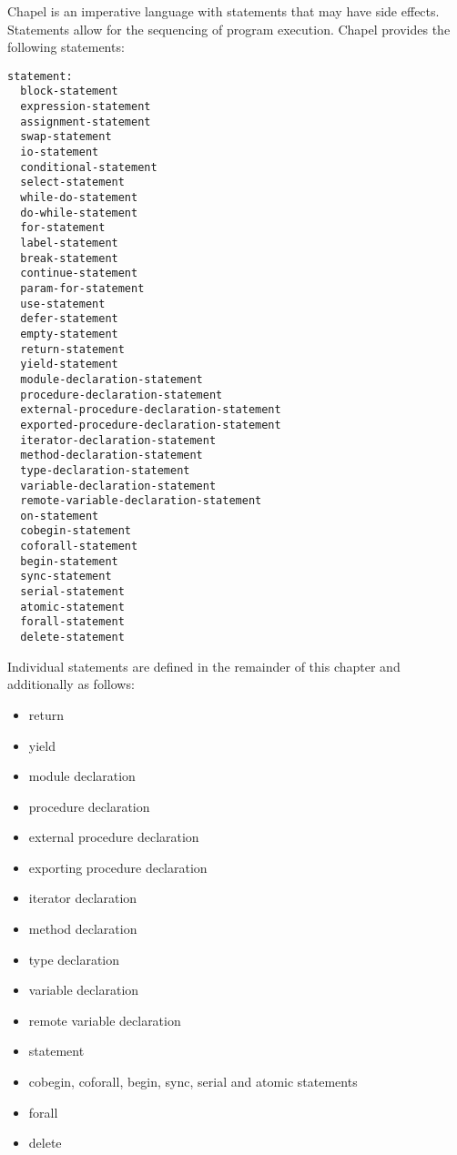 \label{Statements}

Chapel is an imperative language with statements that may have side
effects.  Statements allow for the sequencing of program execution.
Chapel provides the following statements:

\begin{syntax}
\begin{verbatim}
statement:
  block-statement
  expression-statement
  assignment-statement
  swap-statement
  io-statement
  conditional-statement
  select-statement
  while-do-statement
  do-while-statement
  for-statement
  label-statement
  break-statement
  continue-statement
  param-for-statement
  use-statement
  defer-statement
  empty-statement
  return-statement
  yield-statement
  module-declaration-statement
  procedure-declaration-statement
  external-procedure-declaration-statement
  exported-procedure-declaration-statement
  iterator-declaration-statement
  method-declaration-statement
  type-declaration-statement
  variable-declaration-statement
  remote-variable-declaration-statement
  on-statement
  cobegin-statement
  coforall-statement
  begin-statement
  sync-statement
  serial-statement
  atomic-statement
  forall-statement
  delete-statement
\end{verbatim}
\end{syntax}

Individual statements are defined in the remainder of this chapter
and additionally as follows:

\begin{itemize}
\item return 
\item yield 
\item module declaration 
\item procedure declaration 
\item external procedure declaration 
\item exporting procedure declaration 
\item iterator declaration 
\item method declaration 
\item type declaration 
\item variable declaration 
\item remote variable declaration ~
\item {} statement 
\item cobegin, coforall, begin, sync, serial and atomic statements
\item forall 
\item delete 
\end{itemize}


